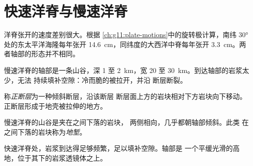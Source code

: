 \section{快速洋脊与慢速洋脊}

洋脊张开的速度差别很大。根据
\cref{ch:g11:plate-motions}中的旋转极计算，南纬 \ang{30} 处的东太平洋海隆每年张开
\qty{14.6}{cm}，同纬度的大西洋中脊每年张开
\qty{3.3}{cm}。两者轴部的形态并不相同。

慢速洋脊的轴部是一条山谷，深 1 至 \qty{2}{km}，宽 20
至 \qty{30}{km}。到达轴部的岩浆太少，无法
持续填补空隙：冷而脆的被拉开，并沿
断层断裂。

\begin{definition}[正断层]\label{def:g11:ocean-ridges:normal-fault}
称\emph{正断层}为一种倾斜断层，沿该断层
断层面上方的岩块相对下方岩块向下移动。
正断层形成于地壳被拉伸的地方。
\end{definition}

慢速洋脊的山谷是夹在之间下落的岩块，
两侧相向，几乎都朝轴部倾斜。此类
在之间下落的岩块称为\emph{地堑}。

快速洋脊处，岩浆到达得足够频繁，足以填补空隙。轴部是
一个平缓光滑的高地，位于其下的岩浆透镜体之上。

